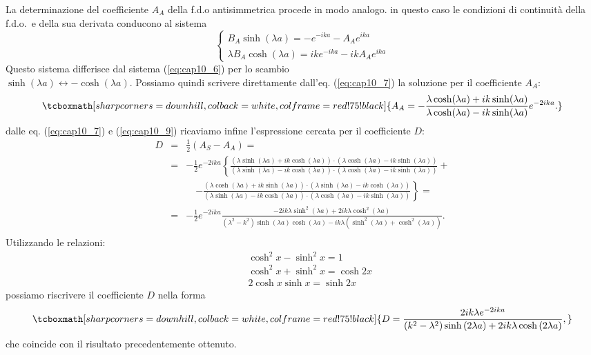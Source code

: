 \documentclass[a4paper,12pt,oneside]{book}
\begin{document}
La determinazione del coefficiente $A_A$ della f.d.o antisimmetrica procede in modo analogo. in questo caso le condizioni di continuità della f.d.o.~e della sua derivata conducono al sistema
	\begin{equation}
		\begin{cases}
		\displaystyle{B_A \sinh (\lambda a) = -e^{-ika}- A_A e^{ika}}\\
		\displaystyle{\lambda B_A \cosh (\lambda a) = ik e^{-ika}- ikA_A e^{ika}}
		\end{cases}
	\label{eq:cap10_8}
	\end{equation}
Questo sistema differisce dal sistema (\ref{eq:cap10_6}) per lo scambio\\ $\sinh (\lambda a) \leftrightarrow -\cosh (\lambda a)$. Possiamo quindi scrivere direttamente dall'eq. (\ref{eq:cap10_7}) la soluzione per il coefficiente $A_A$:
	\begin{equation}
		\tcboxmath[sharp corners=downhill, colback=white, colframe=red!75!black]{
			A_A=-\frac{\lambda \cosh (\lambda a)+ik \sinh (\lambda a)}{\lambda \cosh (\lambda a)-ik \sinh (\lambda a)}e^{-2ika}.
			}
	\label{eq:cap10_9}
	\end{equation}
dalle eq. (\ref{eq:cap10_7}) e (\ref{eq:cap10_9}) ricaviamo infine l'espressione cercata per il coefficiente $D$:
	\begin{eqnarray}
		D&=&\frac{1}{2}\left( A_S - A_A \right)= \nonumber \\
		&=& -\frac{1}{2}e^{-2ika}\left\lbrace \frac{\left( \lambda \sinh (\lambda a)+ ik \cosh (\lambda a )\right)\cdot\left( \lambda \cosh (\lambda a)- ik \sinh (\lambda a )\right)}{\left( \lambda\sinh ( \lambda a )-ik \cosh (\lambda a )\right)\cdot\left(\lambda \cosh ( \lambda a )-ik \sinh (\lambda a )\right)}\right. +\nonumber \\
		& &\quad \left. -\frac{\left( \lambda \cosh (\lambda a)+ ik \sinh (\lambda a )\right)\cdot \left( \lambda \sinh (\lambda a)- ik \cosh (\lambda a )\right)}{(\lambda \sinh (\lambda a)- ik\cosh (\lambda a )) \cdot (\lambda \cosh (\lambda a ) - ik \sinh (\lambda a ))}\right\rbrace= \nonumber \\
		&=& -\frac{1}{2}e^{-2ika} \frac{-2ik\lambda \sinh ^2 (\lambda a) + 2ik \lambda \cosh ^2 (\lambda a)}{ \left(\lambda ^2 - k^2 \right) \sinh (\lambda a ) \cosh (\lambda a) - ik\lambda \left(\sinh ^2 (\lambda a) + \cosh ^2 (\lambda a ) \right)}.\nonumber \\
	\end{eqnarray}
Utilizzando le relazioni:
	\begin{eqnarray}
		& &\cosh ^2 x - \sinh ^2 x=1 \nonumber \\
		& &\cosh ^2 x + \sinh ^2 x=\cosh 2x  \\
		& &2 \cosh  x \sinh  x=\sinh 2x \nonumber 
	\end{eqnarray}
possiamo riscrivere il coefficiente $D$ nella forma
	\begin{equation}
		\tcboxmath[sharp corners=downhill, colback=white, colframe=red!75!black]{	
			D=\frac{2ik\lambda e^{-2ika}}{\left(k^2-\lambda^2\right)\sinh \left(2\lambda a\right)+2ik\lambda \cosh\left(2\lambda a\right)},
			}
	\end{equation}
che coincide con il risultato precedentemente ottenuto.
\end{document}

